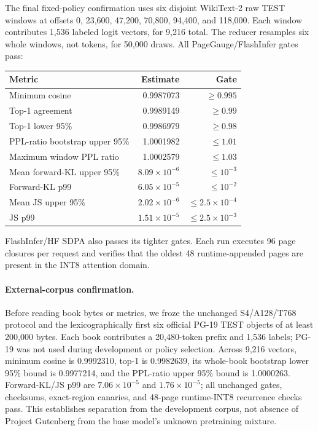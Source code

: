 The final fixed-policy confirmation uses six disjoint WikiText-2 raw TEST
windows at offsets 0, 23,600, 47,200, 70,800, 94,400, and 118,000. Each window
contributes 1,536 labeled logit vectors, for 9,216 total. The reducer resamples six
whole windows, not tokens, for 50,000 draws. All PageGauge/FlashInfer gates pass:
\begin{center}
\begin{tabular}{lrr}
\toprule
Metric & Estimate & Gate \\
\midrule
Minimum cosine & 0.9987073 & $\ge0.995$ \\
Top-1 agreement & 0.9989149 & $\ge0.99$ \\
Top-1 lower 95\% & 0.9986979 & $\ge0.98$ \\
PPL-ratio bootstrap upper 95\% & 1.0001982 & $\le1.01$ \\
Maximum window PPL ratio & 1.0002579 & $\le1.03$ \\
Mean forward-KL upper 95\% & $8.09\times10^{-6}$ & $\le10^{-3}$ \\
Forward-KL p99 & $6.05\times10^{-5}$ & $\le10^{-2}$ \\
Mean JS upper 95\% & $2.02\times10^{-6}$ & $\le2.5\times10^{-4}$ \\
JS p99 & $1.51\times10^{-5}$ & $\le2.5\times10^{-3}$ \\
\bottomrule
\end{tabular}
\end{center}
FlashInfer/HF SDPA also passes its tighter gates. Each run executes 96 page
closures per request and verifies that the oldest 48 runtime-appended pages are
present in the INT8 attention domain.

\paragraph{External-corpus confirmation.}
Before reading book bytes or metrics, we froze the unchanged S4/A128/T768
protocol and the lexicographically first six official PG-19 TEST objects of at
least 200,000 bytes. Each book contributes a 20,480-token prefix and 1,536
labels; PG-19 was not used during \method{} development or policy selection.
Across 9,216 vectors, minimum cosine is 0.9992310, top-1 is 0.9982639, its
whole-book bootstrap lower 95\% bound is 0.9977214, and the PPL-ratio upper
95\% bound is 1.0000263. Forward-KL/JS p99 are $7.06\times10^{-5}$ and
$1.76\times10^{-5}$; all unchanged gates, checksums, exact-region canaries,
and 48-page runtime-INT8 recurrence checks pass. This establishes separation
from the \method{} development corpus, not absence of Project Gutenberg from
the base model's unknown pretraining mixture.

